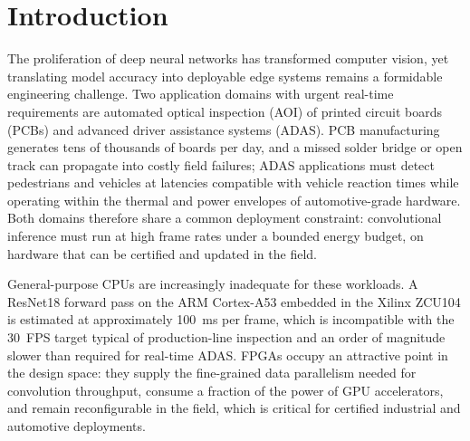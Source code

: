 \documentclass[conference]{IEEEtran}
\begin{document}
\section{Introduction}

The proliferation of deep neural networks has transformed computer vision, yet translating model accuracy into deployable edge systems remains a formidable engineering challenge. Two application domains with urgent real-time requirements are automated optical inspection (AOI) of printed circuit boards (PCBs) and advanced driver assistance systems (ADAS). PCB manufacturing generates tens of thousands of boards per day, and a missed solder bridge or open track can propagate into costly field failures; ADAS applications must detect pedestrians and vehicles at latencies compatible with vehicle reaction times while operating within the thermal and power envelopes of automotive-grade hardware. Both domains therefore share a common deployment constraint: convolutional inference must run at high frame rates under a bounded energy budget, on hardware that can be certified and updated in the field.

General-purpose CPUs are increasingly inadequate for these workloads. A ResNet18 forward pass on the ARM Cortex-A53 embedded in the Xilinx ZCU104 is estimated at approximately 100~ms per frame, which is incompatible with the 30~FPS target typical of production-line inspection and an order of magnitude slower than required for real-time ADAS. FPGAs occupy an attractive point in the design space: they supply the fine-grained data parallelism needed for convolution throughput, consume a fraction of the power of GPU accelerators, and remain reconfigurable in the field, which is critical for certified industrial and automotive deployments.
\end{document}
